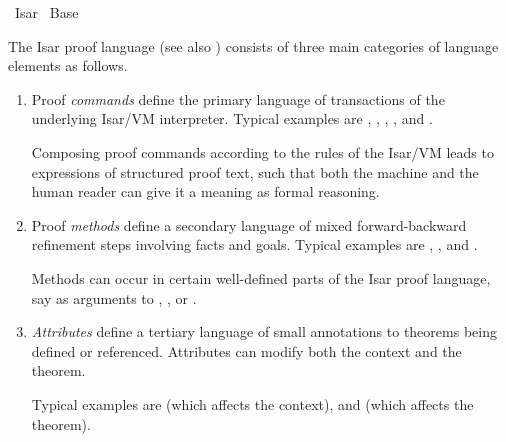 %
\begin{isabellebody}%
\def\isabellecontext{Isar}%
%
\isadelimtheory
%
\endisadelimtheory
%
\isatagtheory
{}\isamarkupfalse%
\ Isar\isanewline
{}\ Base\isanewline
{}%
\endisatagtheory
{\isafoldtheory}%
%
\isadelimtheory
%
\endisadelimtheory
%
\isamarkuptrue%
%
\begin{isamarkuptext}%
The Isar proof language (see also
  \cite[\S2]{isabelle-isar-ref}) consists of three main categories of
  language elements as follows.

  \begin{enumerate}

  \item Proof \emph{commands} define the primary language of
  transactions of the underlying Isar/VM interpreter.  Typical
  examples are \hyperlink{command.fix}{\mbox{}}, \hyperlink{command.assume}{\mbox{}}, \hyperlink{command.show}{\mbox{}}, \hyperlink{command.proof}{\mbox{}}, and \hyperlink{command.qed}{\mbox{}}.

  Composing proof commands according to the rules of the Isar/VM leads
  to expressions of structured proof text, such that both the machine
  and the human reader can give it a meaning as formal reasoning.

  \item Proof \emph{methods} define a secondary language of mixed
  forward-backward refinement steps involving facts and goals.
  Typical examples are \hyperlink{method.rule}{\mbox{}}, \hyperlink{method.unfold}{\mbox{}}, and \hyperlink{method.simp}{\mbox{}}.

  Methods can occur in certain well-defined parts of the Isar proof
  language, say as arguments to \hyperlink{command.proof}{\mbox{}}, \hyperlink{command.qed}{\mbox{}},
  or \hyperlink{command.by}{\mbox{}}.

  \item \emph{Attributes} define a tertiary language of small
  annotations to theorems being defined or referenced.  Attributes can
  modify both the context and the theorem.

  Typical examples are \hyperlink{attribute.intro}{\mbox{}} (which affects the context),
  and \hyperlink{attribute.symmetric}{\mbox{}} (which affects the theorem).


\end{enumerate}
\end{isamarkuptext}
\end{isabellebody}
